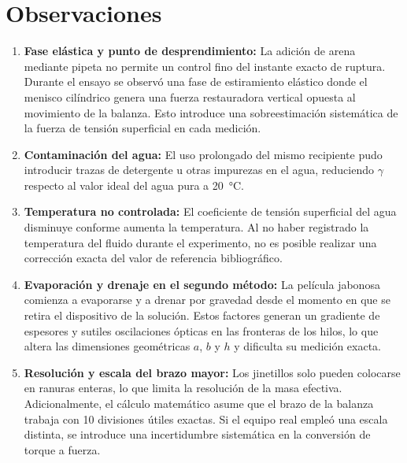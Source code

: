 
\section{Observaciones}
\label{sec:observaciones}

\begin{enumerate}

    \item \textbf{Fase elástica y punto de desprendimiento:} La adición de
    arena mediante pipeta no permite un control fino del instante exacto
    de ruptura. Durante el ensayo se observó una fase de estiramiento elástico
    donde el menisco cilíndrico genera una fuerza restauradora vertical opuesta
    al movimiento de la balanza. Esto introduce 
    una sobreestimación sistemática de la fuerza de tensión superficial en
    cada medición.

    \item \textbf{Contaminación del agua:} El uso prolongado del mismo
    recipiente pudo introducir trazas de detergente u otras impurezas en
    el agua, reduciendo $\gamma$ respecto al valor ideal del agua pura a
    \SI{20}{\celsius}.

    \item \textbf{Temperatura no controlada:} El coeficiente de tensión
    superficial del agua disminuye conforme aumenta la temperatura. Al no
    haber registrado la temperatura del fluido durante el experimento, no
    es posible realizar una corrección exacta del valor de referencia
    bibliográfico.

    \item \textbf{Evaporación y drenaje en el segundo método:} La
    película jabonosa comienza a evaporarse y a drenar por gravedad desde
    el momento en que se retira el dispositivo de la solución. 
    Estos factores generan un gradiente de espesores y sutiles oscilaciones 
    ópticas en las fronteras de los hilos, lo que altera las dimensiones geométricas 
    $a$, $b$ y $h$ y dificulta su medición exacta.

    \item \textbf{Resolución y escala del brazo mayor:} Los jinetillos
    solo pueden colocarse en ranuras enteras, lo que limita la resolución
    de la masa efectiva. Adicionalmente, el cálculo matemático asume que el 
    brazo de la balanza trabaja con 10 divisiones útiles exactas. 
    Si el equipo real empleó una escala distinta, se introduce una incertidumbre 
    sistemática en la conversión de torque a fuerza.

\end{enumerate}

